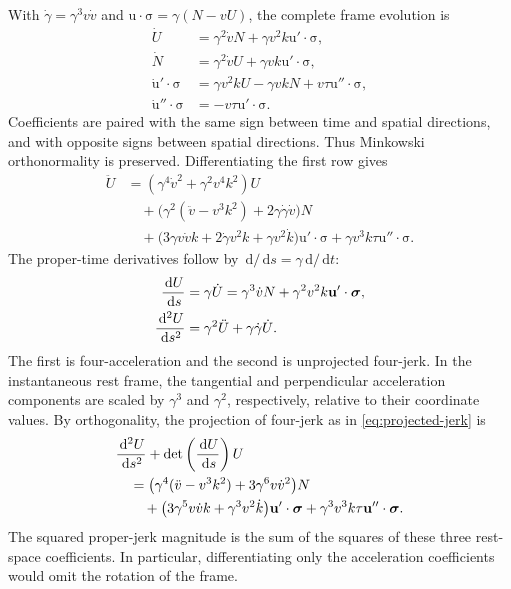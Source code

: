 \documentclass[11pt]{article}
\newcommand{\pv}[1]{{#1}}
\newcommand{\vstyle}[1]{{\bm{\mathrm{#1}}}}
\newcommand{\pN}{\pv{N}}
\newcommand{\pU}{\pv{U}}
\numberwithin{equation}{section}
\newcommand{\dotprod}{\cdot}
\newcommand{\bsig}{\vstyle{\sigma}}
\newcommand{\bu}{\vstyle{u}}
\newcommand{\dd}{\,\mathrm d}
\begin{document}
With $\dot\gamma=\gamma^3v\dot v$ and
$\bu\dotprod\bsig=\gamma(\pN-v\pU)$, the complete frame evolution is
\begin{align*}
 \dot\pU&=\gamma^2\dot v\pN+\gamma v^2k\bu'\dotprod\bsig,\\
 \dot\pN&=\gamma^2\dot v\pU+\gamma vk\bu'\dotprod\bsig,\\
 \dot{\bu}'\dotprod\bsig
 &=\gamma v^2k\pU-\gamma vk\pN+v\tau\bu''\dotprod\bsig,\\
 \dot{\bu}''\dotprod\bsig&=-v\tau\bu'\dotprod\bsig.
\end{align*}
Coefficients are paired with the same sign between time and spatial directions,
and with opposite signs between spatial directions. Thus Minkowski orthonormality is
preserved. Differentiating the first row gives
\begin{align*}
 \ddot\pU
 &=(\gamma^4\dot v^2+\gamma^2v^4k^2)\pU\\
 &\quad+\bigl(\gamma^2(\ddot v-v^3k^2)
                  +2\gamma\dot\gamma\dot v\bigr)\pN\\
 &\quad+\bigl(3\gamma v\dot vk+2\dot\gamma v^2k
                  +\gamma v^2\dot k\bigr)\bu'\dotprod\bsig
       +\gamma v^3k\tau\bu''\dotprod\bsig.
\end{align*}
The proper-time derivatives follow by $\dd/\dd s=\gamma\dd/\dd t$:
\begin{align}
 \frac{\dd\pU}{\dd s}
 &=\gamma\dot\pU
 =\gamma^3\dot v\pN+\gamma^2v^2k\bu'\dotprod\bsig,
 \label{eq:frenet-four-acceleration}\\
 \frac{\dd^2\pU}{\dd s^2}
 &=\gamma^2\ddot\pU+\gamma\dot\gamma\dot\pU.
 \notag
\end{align}
The first is four-acceleration and the second is unprojected four-jerk.
In the instantaneous rest frame, the tangential and perpendicular
acceleration components are scaled by $\gamma^3$ and $\gamma^2$,
respectively, relative to their coordinate values.
By orthogonality, the projection of four-jerk as in \eqref{eq:projected-jerk} is
\begin{align}
 &\frac{\dd^2\pU}{\dd s^2}
 +\det\left(\frac{\dd\pU}{\dd s}\right)\pU\notag\\
 &\quad=\bigl(\gamma^4(\ddot v-v^3k^2)
                 +3\gamma^6v\dot v^2\bigr)\pN\notag\\
 &\qquad+\bigl(3\gamma^5v\dot vk+\gamma^3v^2\dot k\bigr)
               \bu'\dotprod\bsig
        +\gamma^3v^3k\tau\bu''\dotprod\bsig.
 \label{eq:frenet-proper-jerk}
\end{align}
The squared proper-jerk magnitude is the sum of the squares of these
three rest-space coefficients. In particular, differentiating only the
acceleration coefficients would omit the rotation of the frame.
\end{document}
